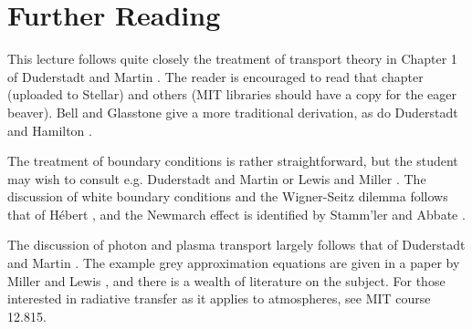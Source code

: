 \section*{Further Reading}
This lecture follows quite closely the treatment of transport theory in Chapter 1 of Duderstadt and Martin \cite{duderstadt1976tt}.  The reader is encouraged to read that chapter (uploaded to Stellar) and others (MIT libraries should have a copy for the eager beaver).  Bell and Glasstone \cite{bell1970nrt} give a more traditional derivation, as do Duderstadt and Hamilton \cite{duderstadt1976nra}.
 
The treatment of boundary conditions is rather straightforward, but the student may wish to consult e.g. Duderstadt and Martin \cite{duderstadt1976tt} or Lewis and Miller \cite{lewis1993cmn}.  The discussion of white boundary conditions and the Wigner-Seitz dilemma follows that of H\'{e}bert \cite{hebert2009arp}, and the Newmarch effect is identified by Stamm'ler and Abbate \cite{stammler1983mss}.   

The discussion of photon and plasma transport largely follows that of Duderstadt and Martin \cite{duderstadt1976tt}.  The example grey approximation equations are given in a paper by Miller and Lewis \cite{miller1987nrm}, and there is a wealth of literature on the subject.  For those interested in radiative transfer as it applies to atmospheres, see MIT course 12.815.

